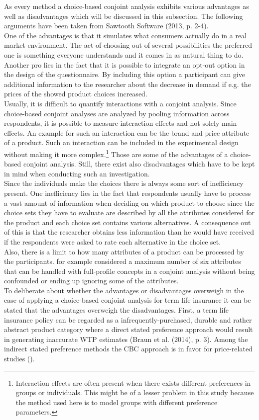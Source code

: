 \documentclass[12pt, abstracton]{article}
\begin{document}
As every method a choice-based conjoint analysis exhibits various advantages as well as disadvantages which will be discussed in this subsection. The following arguments have been taken from Sawtooth Software (2013, p. 2-4).\\
One of the advantages is that it simulates what consumers actually do in a real market environment. The act of choosing out of several possibilities the preferred one is something everyone understands and it comes in as natural thing to do.
Another pro lies in the fact that it is possible to integrate an opt-out option in the design of the questionnaire. By including this option a participant can give additional information to the researcher about the decrease in demand if e.g. the prices of the showed product choices increased.\\
Usually, it is difficult to quantify interactions with a conjoint analysis. Since choice-based conjoint analyses are analyzed by pooling information across respondents, it is possible to measure interaction effects and not solely main effects. An example for such an interaction can be the brand and price attribute of a product. Such an interaction can be included in the experimental design without making it more complex.\footnote{Interaction effects are often present when there exists different preferences in groups or individuals. This might be of a lesser problem in this study because the method used here is to model groups with different preference parameters.} Those are some of the advantages of a choice-based conjoint analysis. Still, there exist also disadvantages which have to be kept in mind when conducting such an investigation.\\
Since the individuals make the choices there is always some sort of inefficiency present. One inefficiency lies in the fact that respondents usually have to process a vast amount of information when deciding on which product to choose since the choice sets they have to evaluate are described by all the attributes considered for the product and each choice set contains various alternatives. A consequence out of this is that the researcher obtains less information than he would have received if the respondents were asked to rate each alternative in the choice set.\\
Also, there is a limit to how many attributes of a product can be processed by the participants. \cite{Green1990} for example considered a maximum number of six attributes that can be handled with full-profile concepts in a conjoint analysis without being confounded or ending up ignoring some of the attributes.\\
To deliberate about whether the advantages or disadvantages overweigh in the case of applying a choice-based conjoint analysis for term life insurance it can be stated that the advantages overweigh the disadvantages. First, a term life insurance policy can be regarded as a infrequently-purchased, durable and rather abstract product category where a direct stated preference approach would result in generating inaccurate WTP estimates (Braun et al. (2014), p. 3). Among the indirect stated preference methods the CBC approach is in favor for price-related studies (\cite{Orme2009}).
\end{document}
